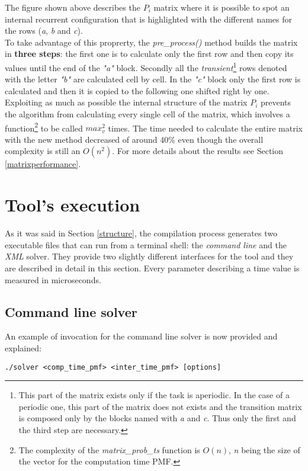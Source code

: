 The figure shown above describes the \( P_{i} \) matrix where it is possible to spot an internal recurrent configuration that is highlighted with the different names for the rows (\emph{a}, \emph{b} and \emph{c}).\\
To take advantage of this proprerty, the \emph{pre\_process()} method builds the matrix in \textbf{three steps}: the first one is to calculate only the first row and then copy its values until the end of the \emph{"a"} block. Secondly all the \emph{transient}\footnote{This part of the matrix exists only if the task is aperiodic. In the case of a periodic one, this part of the matrix does not exists and the transition matrix is composed only by the blocks named with \emph{a} and \emph{c}. Thus only the first and the third step are necessary.} rows denoted with the letter \emph{"b"} are calculated cell by cell. In the \emph{"c"} block only the first row is calculated and then it is copied to the following one shifted right by one.\\
Exploiting as much as possible the internal structure of the matrix \( P_{i} \) prevents the algorithm from calculating every single cell of the matrix, which involves a function\footnote{The complexity of the \emph{matrix\_prob\_ts} function is \( O(n) \), \emph{n} being the size of the vector for the computation time PMF.} to be called \( max_{v}^{2} \) times. The time needed to calculate the entire matrix with the new method decreased of around 40\% even though the overall complexity is still an \( O(n^{2}) \). For more details about the results see Section \ref{matrixperformance}.

\section{Tool's execution}
As it was said in Section \ref{structure}, the compilation process generates two executable files that can run from a terminal shell: the \emph{command line} and the \emph{XML} solver. They provide two slightly different interfaces for the tool and they are described in detail in this section. Every parameter describing a time value is measured in microseconds.

\subsection{Command line solver}
An example of invocation for the command line solver is now provided and explained:
\begin{lstlisting}[frame=bt, numbers=none]
  ./solver <comp_time_pmf> <inter_time_pmf> [options]
\end{lstlisting}    


